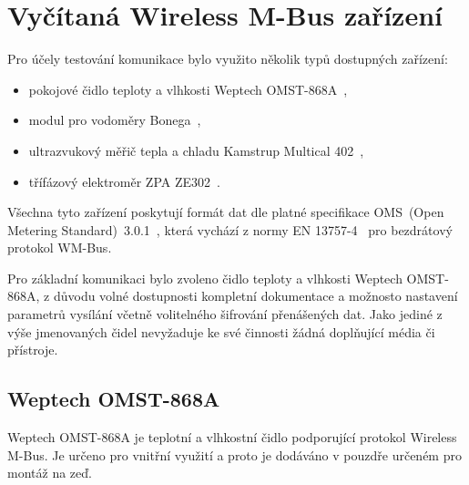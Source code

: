 \chapter{Vyčítaná Wireless M-Bus zařízení}

Pro účely testování komunikace bylo využito několik typů dostupných zařízení:
\begin{itemize}
	\item pokojové čidlo teploty a vlhkosti Weptech OMST-868A~\cite{CidloWeptech},
	\item modul pro vodoměry Bonega~\cite{CidloBonega},
	\item ultrazvukový měřič tepla a chladu Kamstrup Multical 402~\cite{CidloKamstrup},
	\item třífázový elektroměr ZPA ZE302~\cite{CidloZpa}.
\end{itemize}

Všechna tyto zařízení poskytují formát dat dle platné specifikace OMS~(Open Metering Standard)~3.0.1~\cite{NormaOMS}, která vychází z normy EN 13757-4~\cite{Norma4} pro bezdrátový protokol WM-Bus.

Pro základní komunikaci bylo zvoleno čidlo teploty a vlhkosti Weptech OMST-868A, z důvodu volné dostupnosti kompletní dokumentace a možnosto nastavení parametrů vysílání včetně volitelného šifrování přenášených dat. Jako jediné z výše jmenovaných čidel nevyžaduje ke své činnosti žádná doplňující média či přístroje.
	
	
	
	\section{Weptech OMST-868A}
	
	Weptech OMST-868A je teplotní a vlhkostní čidlo podporující protokol Wireless M-Bus. Je určeno pro vnitřní využití a proto je dodáváno v pouzdře určeném pro montáž na zeď.
	
	

